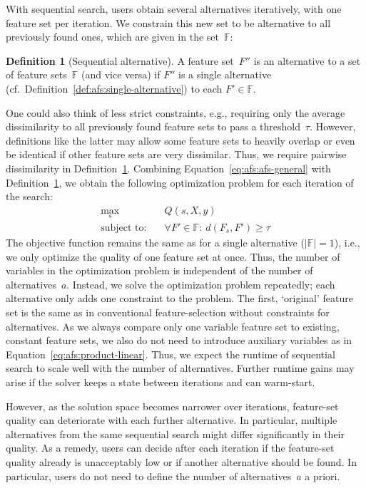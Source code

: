 \documentclass{article}
\theoremstyle{definition}
\newtheorem{definition}[proposition]{Definition} %
\begin{document}
With sequential search, users obtain several alternatives iteratively, with one feature set per iteration.
We constrain this new set to be alternative to all previously found ones, which are given in the set~$\mathbb{F}$:
%
\begin{definition}[Sequential alternative]
	A feature set~$F''$ is an alternative to a set of feature sets~$\mathbb{F}$ (and vice versa) if $F''$ is a single alternative (cf.~Definition~\ref{def:afs:single-alternative}) to each $F' \in \mathbb{F}$.
	\label{def:afs:sequential-alternative}
\end{definition}
%
One could also think of less strict constraints, e.g., requiring only the average dissimilarity to all previously found feature sets to pass a threshold~$\tau$.
However, definitions like the latter may allow some feature sets to heavily overlap or even be identical if other feature sets are very dissimilar.
Thus, we require pairwise dissimilarity in Definition~\ref{def:afs:sequential-alternative}.
Combining Equation~\ref{eq:afs:afs-general} with Definition~\ref{def:afs:sequential-alternative}, we obtain the following optimization problem for each iteration of the search:
%
\begin{equation}
	\begin{aligned}
		\max_s &\quad Q(s,X,y) \\
		\text{subject to:} &\quad \forall F' \in \mathbb{F}:~d(F_s,F') \geq \tau
	\end{aligned}
	\label{eq:afs:afs-sequential}
\end{equation}
%
The objective function remains the same as for a single alternative ($|\mathbb{F}| = 1$), i.e., we only optimize the quality of one feature set at once.
Thus, the number of variables in the optimization problem is independent of the number of alternatives~$a$.
Instead, we solve the optimization problem repeatedly; each alternative only adds one constraint to the problem.
The first, `original' feature set is the same as in conventional feature-selection without constraints for alternatives.
As we always compare only one variable feature set to existing, constant feature sets, we also do not need to introduce auxiliary variables as in Equation~\ref{eq:afs:product-linear}.
Thus, we expect the runtime of sequential search to scale well with the number of alternatives.
Further runtime gains may arise if the solver keeps a state between iterations and can warm-start.

However, as the solution space becomes narrower over iterations, feature-set quality can deteriorate with each further alternative.
In particular, multiple alternatives from the same sequential search might differ significantly in their quality.
As a remedy, users can decide after each iteration if the feature-set quality already is unacceptably low or if another alternative should be found.
In particular, users do not need to define the number of alternatives~$a$ a priori.
\end{document}
